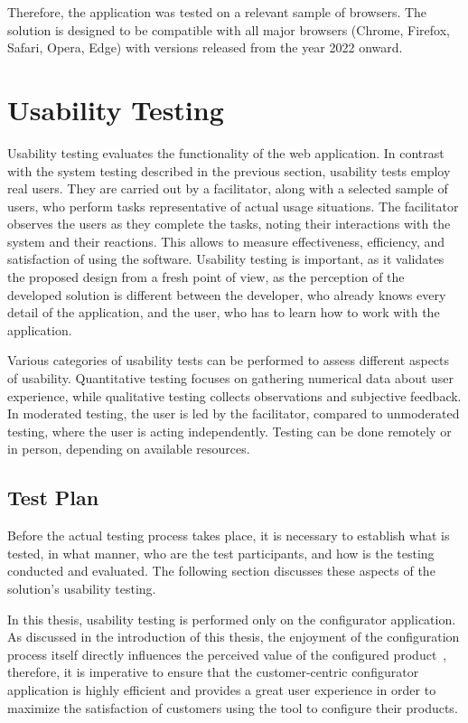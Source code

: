 Therefore, the application was tested on a relevant sample of browsers. The solution is designed to be compatible with all major browsers (Chrome, Firefox, Safari, Opera, Edge) with versions released from the year 2022 onward.


\section{Usability Testing}

Usability testing evaluates the functionality of the web application. In contrast with the system testing described in the previous section, usability tests employ real users. They are carried out by a facilitator, along with a selected sample of users, who perform tasks representative of actual usage situations. The facilitator observes the users as they complete the tasks, noting their interactions with the system and their reactions. This allows to measure effectiveness, efficiency, and satisfaction of using the software. Usability testing is important, as it validates the proposed design from a fresh point of view, as the perception of the developed solution is different between the developer, who already knows every detail of the application, and the user, who has to learn how to work with the application.~\cite{Barnum2021}

Various categories of usability tests can be performed to assess different aspects of usability. Quantitative testing focuses on gathering numerical data about user experience, while qualitative testing collects observations and subjective feedback. In moderated testing, the user is led by the facilitator, compared to unmoderated testing, where the user is acting independently. Testing can be done remotely or in person, depending on available resources.~\cite{Moran2019}

\subsection{Test Plan}

Before the actual testing process takes place, it is necessary to establish what is tested, in what manner, who are the test participants, and how is the testing conducted and evaluated. The following section discusses these aspects of the solution's usability testing.

In this thesis, usability testing is performed only on the configurator application. As discussed in the introduction of this thesis, the enjoyment of the configuration process itself directly influences the perceived value of the configured product~\cite{Franke2010}, therefore, it is imperative to ensure that the customer-centric configurator application is highly efficient and provides a great user experience in order to maximize the satisfaction of customers using the tool to configure their products.

